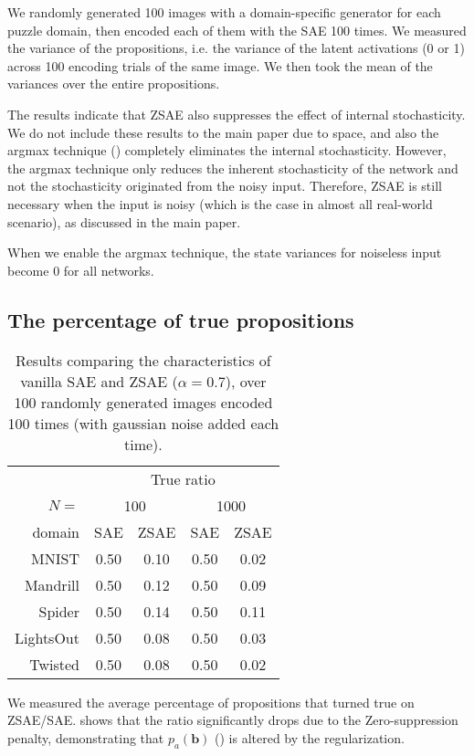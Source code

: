 \documentclass[10pt,letterpaper]{article}
\begin{document}
We randomly generated 100 images with a domain-specific generator for each puzzle domain,
then encoded each of them with the SAE 100 times.
We measured the variance of the propositions, i.e. the variance of the latent activations (0 or 1)
across 100 encoding trials of the same image.
We then took the mean of the variances over the entire propositions.

The results indicate that ZSAE also suppresses the effect of internal stochasticity.
We do not include these results to the main paper due to space,
and also the argmax technique ()
completely eliminates the internal stochasticity.
However, the argmax technique only reduces the inherent stochasticity of the network
and not the stochasticity originated from the noisy input.
Therefore, ZSAE is still necessary when the input is noisy (which is the case in almost all real-world scenario),
as discussed in the main paper.

When we enable the argmax technique, the state variances for noiseless input become 0 for all networks.

\subsection{The percentage of true propositions}

\begin{table}[htbp]
 \centering
 \setlength{\tabcolsep}{0.45em}
 \begin{tabular}{|r|*{4}{c|}}
       & \multicolumn{4}{c|}{True ratio} \\
$N=$ & \multicolumn{2}{c|}{100} & \multicolumn{2}{c|}{1000} \\
domain    & SAE  & ZSAE & SAE  & ZSAE \\ 
MNIST     & 0.50 & 0.10 & 0.50 & 0.02 \\ 
Mandrill  & 0.50 & 0.12 & 0.50 & 0.09 \\ 
Spider    & 0.50 & 0.14 & 0.50 & 0.11 \\ 
LightsOut & 0.50 & 0.08 & 0.50 & 0.03 \\ 
Twisted   & 0.50 & 0.08 & 0.50 & 0.02 \\ 
\end{tabular}
 \caption{Results comparing the characteristics of vanilla SAE and ZSAE ($\alpha=0.7$),
 over 100 randomly generated images encoded 100 times (with gaussian noise added each time).
 }
\label{tab:trueratio}
\end{table}

We measured the average percentage of propositions that turned true on ZSAE/SAE.
 shows that the ratio significantly drops due to the Zero-suppression penalty,
demonstrating that $p_a(\mathbf{b})$ () is altered by the regularization.
\end{document}
